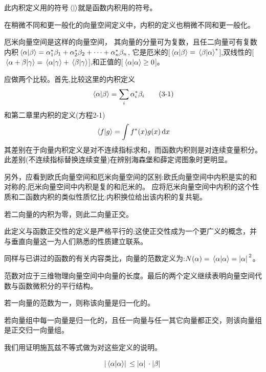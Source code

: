 此内积定义用的符号$\bra*{}\ket*{}$就是函数内积用的符号。

在稍微不同和更一般化的向量空间定义中，内积的定义也稍微不同和更一般化。
\begin{definition}[厄米向量空间]
    厄米向量空间是这样的向量空间， 其向量的分量可为复数，且任二向量可有复数内积$\bra*{\alpha}\ket*{\beta}=\alpha_1^*\beta_1+\alpha_2^*\beta_2+\cdots+\alpha_n^*\beta_n$,
    它是厄米的[$\bra*{\alpha}\ket*{\beta}=\bra*{\beta}\ket*{\alpha}^*$],双线性的[$\bra*{\alpha+\beta}\ket*{\gamma}=\bra*{\alpha}\ket*{\gamma}+\bra*{\beta}\ket*{\gamma}$],和正值的[$\bra*{\alpha}\ket*{\alpha} \geq 0$]。    
\end{definition}

应做两个比较。首先,比较这里的内积定义
\[\bra*{\alpha}\ket*{\beta}=\sum_i\alpha^*_i\beta_i \tag{3-1}\]
和第二章里内积的定义(方程2-1)
\[\bra*{f}\ket*{g}=\int f^*(x)g(x)\dd{x}\]
其差别在于向量内积定义是对不连续指标求和，而函数内积则是对连续变量积分。
此差别(不连续指标替换连续变量)在辨别海森堡和薛定谔图象时更明显。

另外，应看到欧氏向量空间和厄米向量空间的区别:欧氏向量空间中内积是实的和对称的;厄米向量空间中内积是复的和厄米的。
应将厄米向量空间中内积的这个性质和二函数内积的类似性质忆比:内积换位给出该内积的复共轭。
\begin{definition}[向量正交]
    若二向量的内积为零，则此二向量正交。
\end{definition}

此定义与函数正交性的定义是严格平行的;这使正交性成为一个更广义的概念，并与垂直向量这一为人们熟悉的性质建立联系。
\begin{definition}[向量范数]
    同样与已讲过的函数的有关内容类比，向量的范数定义为:$N(\alpha)=\bra*{\alpha}\ket*{\alpha}=\abs*{\alpha}^2$。
\end{definition}

范数对应于三维物理向量空间中向量的长度。最后的两个定义继续表明向量空间代数与函数微积分的平行结构。

\begin{definition}
    若一向量的范数为一，则称该向量是归一化的。
    
    若向量组中每一向量是归一化的，且任一向量与任一其它向量都正交，则该向量组是正交归一向量组。
\end{definition}

我们用证明施瓦兹不等式做为对这些定义的说明。

\begin{theorem}[施瓦兹不等式]
    \[\abs*{\bra*{\alpha}\ket*{\alpha}} \leq \abs*{\alpha} \cdot \abs*{\beta}\]
\end{theorem}

